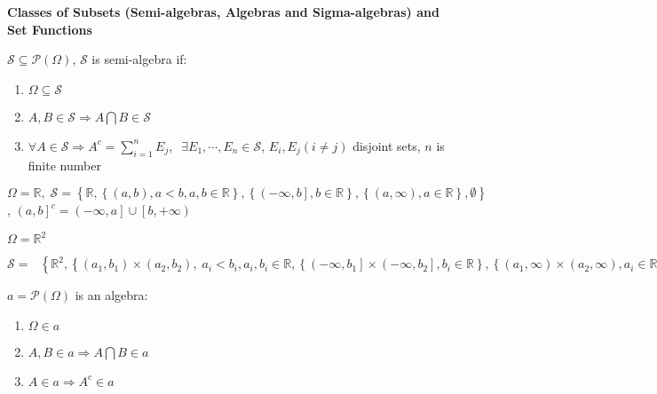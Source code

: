 \setcounter{lecture}{2}

\begin{center}
	 \bf Classes of Subsets (Semi-algebras, Algebras and Sigma-algebras) and Set Functions
\end{center}

\vspace{0.25cm}
 
\begin{definition}
	$ \mathcal{S} \subseteq \mathcal{P} \left( \Omega  \right) $, $ \mathcal{S} $ is semi-algebra if:
	\begin{enumerate}
		\item $ \Omega \subseteq \mathcal{S} $
		\item $ A,B \in \mathcal{S} \Rightarrow A\bigcap B \in \mathcal{S} $
		\item $ \forall A \in \mathcal{S} \Rightarrow {A^c} = \sum\limits_{i = 1}^n {{E_j}} ,\;\;\exists {E_1}, \cdots ,{E_n} \in \mathcal{S} $, $ E_{i},E_{j} \left(i \ne j\right) $ disjoint sets, $ n $ is finite number
	\end{enumerate}
	\label{def2.1}
\end{definition}

\begin{example}
	$\Omega  = \mathbb{R},\;\mathcal{S} = \left\{ {\mathbb{R},\left\{ {\left( {a,b} \right),a < b,a,b \in \mathbb{R}} \right\},\left\{ {\left( { - \infty ,b} \right],b \in \mathbb{R}} \right\},\left\{ {\left( {a,\infty } \right),a \in \mathbb{R}} \right\},\emptyset } \right\}$, ${\left( {a,b} \right]^c} = \left( { - \infty ,a} \right] \cup \left[ {b, + \infty } \right)$
\end{example}

\begin{example}
	\small  
	$\Omega  = {{\mathbb R}^2}$
	
	${\mathcal S} = {\text{ }}\left\{ {{{\mathbb R}^2}} \right.,\left\{ {\left( {{a_1},{b_1}} \right) \times \left( {{a_2},{b_2}} \right),\;{a_i} < {b_i},{a_i},{b_i} \in {\mathbb R},\left\{ {\left( { - \infty ,{b_1}} \right] \times \left( { - \infty ,{b_2}} \right],{b_i} \in {\mathbb R}} \right\},\left\{ {\left( {{a_1},\infty } \right) \times \left( {{a_2},\infty } \right),{a_i} \in {\mathbb R}} \right\},\emptyset } \right\}$
\end{example}

\begin{definition}
	$ a = \mathcal{P}\left(\Omega\right) $ is an algebra:
	\begin{enumerate}
		\item $ \Omega  \in a$ 
		\item $ A,B\in a \Rightarrow A\bigcap B \in a  $
		\item $ A \in a \Rightarrow A^{c} \in a  $
	\end{enumerate}
\end{definition}

